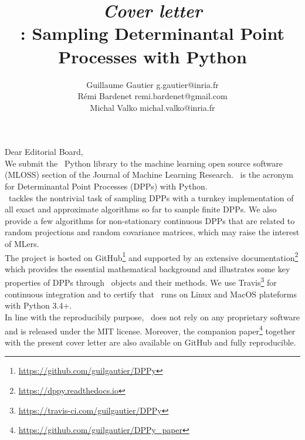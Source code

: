 \documentclass[twoside,11pt]{article}
\begin{document}
\title{\emph{Cover letter}\\[1em]
\DPPy: Sampling Determinantal Point Processes with Python}

\author{\name Guillaume Gautier \email g.gautier@inria.fr \\
       \name R\'emi Bardenet \email remi.bardenet@gmail.com \\
       \name Michal Valko \email michal.valko@inria.fr\\
}


\maketitle

\vspace{2em}

\setcounter{footnote}{3}

Dear Editorial Board,\\

We submit the \DPPy\ Python library to the machine learning open source software (MLOSS) section of the Journal of Machine Learning Research.
\DPPy\ is the acronym for Determinantal Point Processes (DPPs) with Python.\\

\DPPy\ tackles the nontrivial task of sampling DPPs with a turnkey implementation of all exact and approximate algorithms so far to sample finite DPPs.
We also provide a few algorithms for non-stationary continuous DPPs that are related to random projections and random covariance matrices, which may raise the interest of MLers.\\

The project is hosted on GitHub\footnote{\url{https://github.com/guilgautier/DPPy}} and supported by an extensive documentation\footnote{\url{https://dppy.readthedocs.io}} which provides the essential mathematical background and illustrates some key properties of DPPs through \DPPy\ objects and their methods.
We use Travis\footnote{\url{https://travis-ci.com/guilgautier/DPPy}} for continuous integration and to certify that \DPPy\ runs on Linux and MacOS plateforms with Python 3.4+.\\

In line with the reproducibily purpose, \DPPy\ does not rely on any proprietary software and is released under the MIT license.
Moreover, the companion paper\footnote{\url{https://github.com/guilgautier/DPPy_paper}} together with the present cover letter are also available on GitHub and fully reproducible.\\
\end{document}
